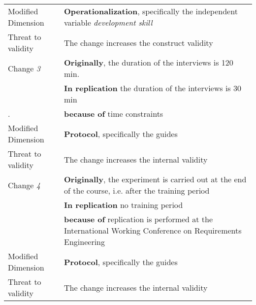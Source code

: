 \begin{table*}[h]
\begin{tabularx}{\textwidth}{
  >{\hsize=0.3\hsize}X
  >{\hsize=0.8\hsize}X}
    Modified Dimension & 
   \textbf{Operationalization}, specifically the independent variable \textit {development skill} \\ 
    Threat to validity  & The change increases the construct validity \\ \hline
    
 
     Change \textit{3}   & \textbf{Originally}, the duration of the interviews is 120 min. \\& \textbf{In replication} the duration of the interviews is 30 min  \\.  
    & \textbf{because of} time constraints \\ 

    Modified Dimension & 
    \textbf{Protocol}, specifically the guides \\   
    Threat to validity & The change increases the internal validity  \\  \hline

    Change \textit{4}   & \textbf{Originally}, the experiment is carried out at the end of the course, i.e. after the training period \\& \textbf{In replication} no training period \\& \textbf{because of} replication is performed at the International Working Conference on Requirements Engineering \\ 

    Modified Dimension & 
    \textbf{Protocol}, specifically the guides \\   
     Threat to validity  & The change increases the internal validity \\ \hline
    
	\end{tabularx}  
	
\end{table*}